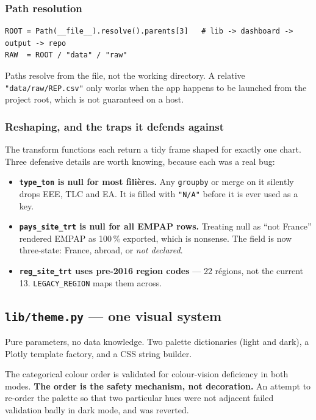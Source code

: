 \documentclass[11pt,a4paper]{article}
\newcommand{\file}[1]{\texttt{#1}}
\begin{document}
\subsubsection*{Path resolution}

\begin{lstlisting}[style=py]
ROOT = Path(__file__).resolve().parents[3]   # lib -> dashboard -> output -> repo
RAW  = ROOT / "data" / "raw"
\end{lstlisting}

Paths resolve from the file, not the working directory. A relative
\file{"data/raw/REP.csv"} only works when the app happens to be launched from
the project root, which is not guaranteed on a host.

\subsubsection*{Reshaping, and the traps it defends against}

The transform functions each return a tidy frame shaped for exactly one chart.
Three defensive details are worth knowing, because each was a real bug:

\begin{itemize}
  \item \textbf{\file{type\_ton} is null for most filières.} Any \file{groupby}
        or merge on it silently drops EEE, TLC and EA. It is filled with
        \file{"N/A"} before it is ever used as a key.
  \item \textbf{\file{pays\_site\_trt} is null for all EMPAP rows.} Treating
        null as ``not France'' rendered EMPAP as 100\,\% exported, which is
        nonsense. The field is now three-state: France, abroad, or
        \emph{not declared}.
  \item \textbf{\file{reg\_site\_trt} uses pre-2016 region codes} --- 22
        régions, not the current 13. \file{LEGACY\_REGION} maps them across.
\end{itemize}

\subsection{\file{lib/theme.py} --- one visual system}

Pure parameters, no data knowledge. Two palette dictionaries (light and dark), a
Plotly template factory, and a CSS string builder.

The categorical colour order is validated for colour-vision deficiency in both
modes. \textbf{The order is the safety mechanism, not decoration.} An attempt to
re-order the palette so that two particular hues were not adjacent failed
validation badly in dark mode, and was reverted.
\end{document}
